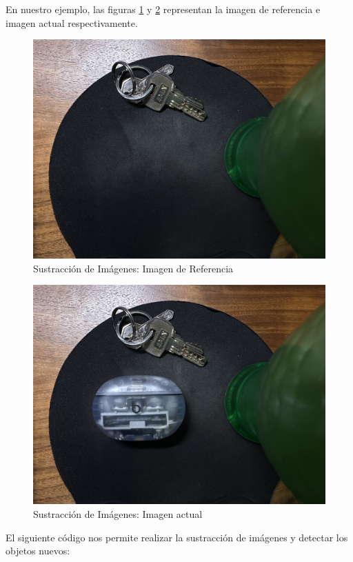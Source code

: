 \documentclass[12pt,letterpaper]{article}
\begin{document}
En nuestro ejemplo, las figuras \ref{fig:sustraccion_referencia} y \ref{fig:sustraccion_actual} representan la imagen de referencia e imagen actual respectivamente.

\begin{figure}[H]
  \centering
  \includegraphics[width=0.5\linewidth]{../data/data-substraction-sample/img-1.jpg}
  \caption{Sustracción de Imágenes: Imagen de Referencia}
  \label{fig:sustraccion_referencia}
\end{figure}

\begin{figure}[H]
  \centering
  \includegraphics[width=0.5\linewidth]{../data/data-substraction-sample/img-2.jpg}
  \caption{Sustracción de Imágenes: Imagen actual}
  \label{fig:sustraccion_actual}
\end{figure}

El siguiente código nos permite realizar la sustracción de imágenes y detectar los objetos nuevos:
\end{document}
